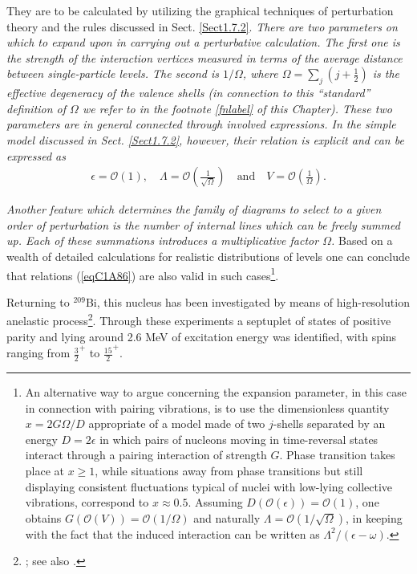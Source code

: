 They are to be calculated by utilizing the graphical techniques of perturbation theory and the rules discussed in Sect. \ref{Sect1.7.2}. 
\textit{There are two parameters on which to expand upon in carrying out a perturbative  calculation. The first one is the strength of the interaction vertices measured in terms of the average distance between single-particle levels. The second is $1/\Omega$,  where $\Omega=\sum_j(j+\frac{1}{2})$ is the effective degeneracy of the valence shells (in connection to this ``standard'' definition of $\Omega$ we refer to in the  footnote \ref{fnlabel} of this Chapter). These two parameters are in general connected through involved expressions. In the simple model discussed in Sect. \ref{Sect1.7.2}, however, their relation is explicit and can be expressed as}
  \begin{align}\label{eqC1A86} 
   \epsilon=\mathcal O(1),\quad \Lambda=\mathcal O\left(\frac{1}{\sqrt{\Omega}}\right)\quad \text{and}\quad V=\mathcal O\left(\frac{1}{\Omega}\right).
    \end{align}   

\textit{Another feature which determines the family of diagrams to select to a given order of perturbation is the number of internal lines which can be freely summed up. Each of these summations introduces a multiplicative factor $\Omega$.} Based on a wealth of detailed calculations for realistic distributions of levels one can conclude that  relations (\ref{eqC1A86}) are also valid  in such cases\footnote{\label{fn107} An alternative way to argue concerning the expansion parameter, in this case in connection with pairing vibrations, is to use the dimensionless quantity $x=2G\Omega/D$ appropriate of a model made of two $j$-shells separated by an energy $D=2\epsilon$ in which pairs of nucleons moving in time-reversal states interact through a pairing interaction of strength $G$. Phase transition takes place at $x\geq1$, while situations away from phase transitions but still displaying consistent fluctuations typical of nuclei with low-lying collective vibrations, correspond to $x\approx0.5$. Assuming $D(\mathcal O(\epsilon))=\mathcal O(1)$, one obtains $G(\mathcal O(V))=\mathcal O(1/\Omega)$ and naturally $\Lambda=\mathcal O(1/\sqrt{\Omega})$, in keeping with the fact that the induced interaction can be written as $\Lambda^2/(\epsilon-\omega)$.}.


Returning to $^{209}$Bi, this nucleus has been investigated by means of high-resolution anelastic process\footnote{\cite{Ungrin:71}; see also \cite{Bohr:75}.}. Through these experiments a septuplet of states of positive parity and lying around 2.6 MeV of excitation energy was identified, with spins 
ranging from $\frac{3}{2}^+$ to $\frac{15}{2}^+$. 




